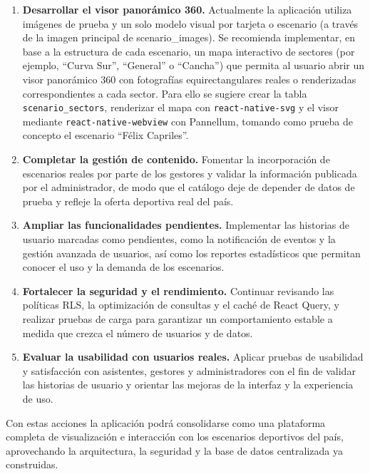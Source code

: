 \begin{enumerate}
  \item \textbf{Desarrollar el visor panor\'amico 360\textdegree{}.} Actualmente la
    aplicaci\'on utiliza im\'agenes de prueba y un solo modelo visual por
    tarjeta o escenario (a trav\'es de la imagen principal de
    scenario\_images). Se recomienda implementar, en base a la estructura de
    cada escenario, un mapa interactivo de sectores (por ejemplo, ``Curva
    Sur'', ``General'' o ``Cancha'') que permita al usuario abrir un visor
    panor\'amico 360\textdegree{} con fotograf\'ias equirectangulares reales o
    renderizadas correspondientes a cada sector. Para ello se sugiere crear la
    tabla \texttt{scenario\_sectors}, renderizar el mapa con
    \texttt{react-native-svg} y el visor mediante \texttt{react-native-webview}
    con Pannellum, tomando como prueba de concepto el escenario ``F\'elix
    Capriles''.

  \item \textbf{Completar la gesti\'on de contenido.} Fomentar la incorporaci\'on
    de escenarios reales por parte de los gestores y validar la informaci\'on
    publicada por el administrador, de modo que el cat\'alogo deje de depender
    de datos de prueba y refleje la oferta deportiva real del pa\'is.

  \item \textbf{Ampliar las funcionalidades pendientes.} Implementar las
    historias de usuario marcadas como pendientes, como la notificaci\'on de
    eventos y la gesti\'on avanzada de usuarios, as\'i como los reportes
    estad\'isticos que permitan conocer el uso y la demanda de los escenarios.

  \item \textbf{Fortalecer la seguridad y el rendimiento.} Continuar revisando
    las pol\'iticas RLS, la optimizaci\'on de consultas y el cach\'e de React
    Query, y realizar pruebas de carga para garantizar un comportamiento
    estable a medida que crezca el n\'umero de usuarios y de datos.

  \item \textbf{Evaluar la usabilidad con usuarios reales.} Aplicar pruebas de
    usabilidad y satisfacci\'on con asistentes, gestores y administradores con
    el fin de validar las historias de usuario y orientar las mejoras de la
    interfaz y la experiencia de uso.
\end{enumerate}

Con estas acciones la aplicaci\'on \nombreApp{} podr\'a consolidarse como una
plataforma completa de visualizaci\'on e interacci\'on con los escenarios
deportivos del pa\'is, aprovechando la arquitectura, la seguridad y la base de
datos centralizada ya construidas.
